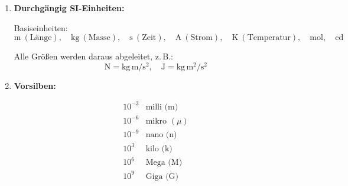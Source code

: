\documentclass[a4paper,12pt]{article}
\begin{document}
\begin{enumerate}
\item \textbf{Durchgängig SI-Einheiten:} 

Basiseinheiten:
\[
\mathrm{m} \ (\text{Länge}), \quad 
\mathrm{kg} \ (\text{Masse}), \quad 
\mathrm{s} \ (\text{Zeit}), \quad 
\mathrm{A} \ (\text{Strom}), \quad 
\mathrm{K} \ (\text{Temperatur}), \quad 
\mathrm{mol}, \quad 
\mathrm{cd}
\]

Alle Größen werden daraus abgeleitet, z.\,B.:
\[
\mathrm{N} = \mathrm{kg\,m/s^2}, \quad
\mathrm{J} = \mathrm{kg\,m^2/s^2}
\]

\item \textbf{Vorsilben:} 

\[
\begin{array}{ll}
10^{-3} & \text{milli (m)} \\
10^{-6} & \text{mikro } (\mu) \\
10^{-9} & \text{nano (n)} \\
10^{3}  & \text{kilo (k)} \\
10^{6}  & \text{Mega (M)} \\
10^{9}  & \text{Giga (G)}
\end{array}
\]

\end{enumerate}
\end{document}

